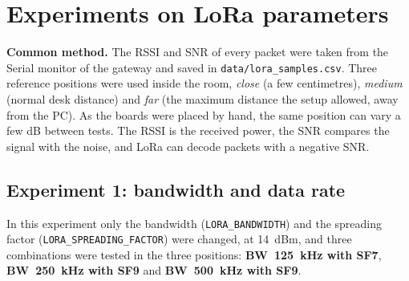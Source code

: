 \documentclass[11pt,a4paper]{article}
\begin{document}
\section{Experiments on LoRa parameters}
\label{sec:exp}

\textbf{Common method.} The RSSI and SNR of every packet were taken from the Serial monitor
of the gateway and saved in \texttt{data/lora\_samples.csv}. Three
reference positions were used inside the room, \emph{close} (a few centimetres),
\emph{medium} (normal desk distance) and \emph{far} (the maximum distance the setup allowed, away from the PC). As the
boards were placed by hand, the same position can vary a few dB between tests. The RSSI is
the received power, the SNR compares the signal with the noise, and
LoRa can decode packets with a negative SNR.

\subsection{Experiment 1: bandwidth and data rate}
\label{sec:bw}

In this experiment only the bandwidth (\texttt{LORA\_BANDWIDTH}) and the spreading factor
(\texttt{LORA\_SPREADING\_FACTOR}) were changed, at 14~dBm, and three combinations were tested
in the three positions: \textbf{BW~125~kHz with SF7}, \textbf{BW~250~kHz with SF9} and
\textbf{BW~500~kHz with SF9}.
\end{document}
